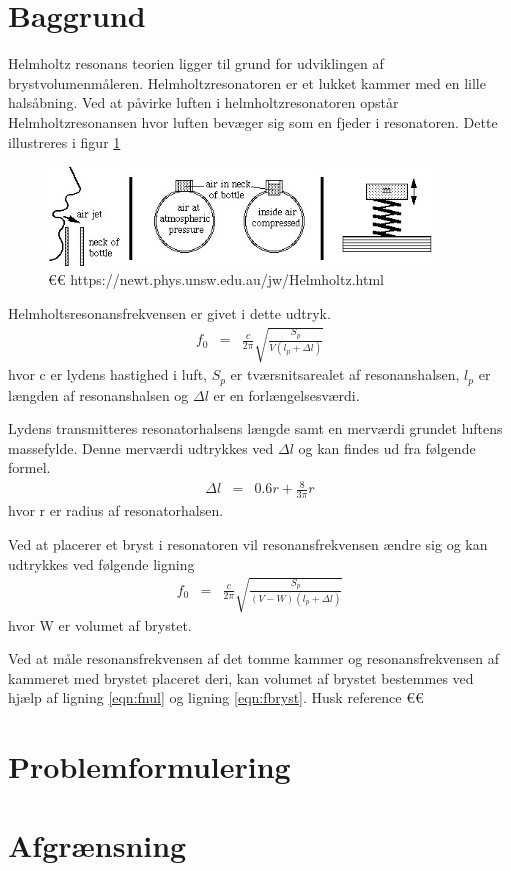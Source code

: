 \section{Baggrund}



Helmholtz resonans teorien ligger til grund for udviklingen af brystvolumenmåleren. Helmholtzresonatoren er et lukket kammer med en lille halsåbning. Ved at påvirke luften i helmholtzresonatoren opstår Helmholtzresonansen hvor luften bevæger sig som en fjeder i resonatoren. Dette illustreres i  figur \ref{fig:Helmholtzteori}

\begin{figure}[htb]
\centering
\includegraphics[width=4in]{Helmholtzresonans}
\caption{€€ https://newt.phys.unsw.edu.au/jw/Helmholtz.html}
\label{fig:Helmholtzteori}
\end{figure}


 
Helmholtsresonansfrekvensen er givet i dette udtryk. 
\begin{eqnarray}
\label{eqn:fnul}
f_{0}&=&\frac{c}{2\pi}\sqrt{\frac{S_{p}}{V \left(l_{p}+\Delta l\right)}}
\end{eqnarray}
hvor c er lydens hastighed i luft, $S_{p}$ er tværsnitsarealet af resonanshalsen, $l_{p}$ er længden af resonanshalsen og $\Delta l$ er en forlængelsesværdi. 

Lydens transmitteres resonatorhalsens længde samt en merværdi grundet luftens massefylde. Denne merværdi udtrykkes ved $\Delta l$ og kan findes ud fra følgende formel. 
\begin{eqnarray}
\Delta l&=&0.6r+\frac{8}{3\pi}r
\end{eqnarray}
hvor r er radius af resonatorhalsen.

Ved at placerer et bryst i resonatoren vil resonansfrekvensen ændre sig og kan udtrykkes ved følgende ligning
\begin{eqnarray}
\label{eqn:fbryst}
f_{0}&=&\frac{c}{2\pi}\sqrt{\frac{S_{p}}{(V-W)\left(l_{p}+\Delta l\right)}}
\end{eqnarray}
hvor W er volumet af brystet. 

Ved at måle resonansfrekvensen af det tomme kammer og resonansfrekvensen af kammeret med brystet placeret deri, kan volumet af brystet bestemmes ved hjælp af ligning \ref{eqn:fnul} og ligning \ref{eqn:fbryst}. Husk reference €€









\section{Problemformulering}

\section{Afgrænsning}
